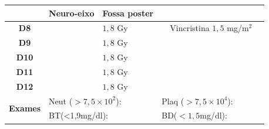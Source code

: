 \documentclass[11pt,a4paper,oldfontcommands]{memoir}
\begin{document}
\begin{center}
\begin{longtable}{p{1cm}p{2cm}|p{2cm}|p{1cm}|p{4cm}|p{3cm}}
    \cline{2-3}
    \multicolumn{1}{c|}{\multirow{1}{*}{}}&{Neuro-eixo}&{Fossa poster}&& \\
	\hline
	\multicolumn{1}{c|}{\multirow{1}{*}{\textbf{D8}}}&\multicolumn{1}{c|}{}&{\(1,8\) Gy}&&{Vincristina \(1,5\) mg/m\(^2\)}&\\
    \multicolumn{1}{c|}{\multirow{1}{*}{\textbf{D9}}}&\multicolumn{1}{c|}{}&{\(1,8\) Gy}&&{}&\\
    \multicolumn{1}{c|}{\multirow{1}{*}{\textbf{D10}}}&\multicolumn{1}{c|}{}&{\(1,8\) Gy}&&{}&\\
    \multicolumn{1}{c|}{\multirow{1}{*}{\textbf{D11}}}&\multicolumn{1}{c|}{}&{\(1,8\) Gy}&&{}&\\
    \multicolumn{1}{c|}{\multirow{1}{*}{\textbf{D12}}}&\multicolumn{1}{c|}{}&{\(1,8\) Gy}&&{}&\\
    \hline
    \multicolumn{1}{c|}{\multirow{2}{*}{\textbf{Exames}}}&\multicolumn{2}{l|}{Neut (\(>7,5\times10^2\)):}&\multicolumn{2}{l|}{Plaq (\(>7,5\times10^4\)):}&\\
    \cline{2-6}
    \multicolumn{1}{c|}{\multirow{2}{*}{{}}}&\multicolumn{2}{l|}{BT(<1,9mg/dl):}&\multicolumn{2}{l|}{BD(\(<1,5\)mg/dl):}&
    \\
    \hline
\end{longtable}


\end{center}
\end{document}

